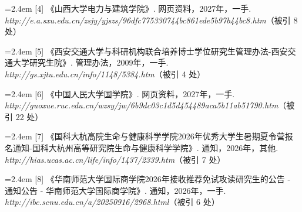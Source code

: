 {\noindent\hangindent=2.4em \label{src:S0004}{\color{cAccent}[4]} 《山西大学电力与建筑学院》. 网页资料，2027年，一手. \textit{http://e.a.sxu.edu.cn/zsjy/yjszs/96dfc775330744bc861ede5b97b44bc8.htm}（被引 8 处）\par
\vspace{0.6pt}
\vspace{3.5pt}\par
\nopagebreak\vspace{1pt}
\noindent\hangindent=2.4em \label{src:S0005}{\color{cAccent}[5]} 《西安交通大学与科研机构联合培养博士学位研究生管理办法-西安交通大学研究生院》. 管理办法，2009年，一手. \textit{http://gs.xjtu.edu.cn/info/1148/5384.htm}（被引 4 处）\par
\vspace{0.6pt}
\vspace{3.5pt}\par
\nopagebreak\vspace{1pt}
\noindent\hangindent=2.4em \label{src:S0006}{\color{cAccent}[6]} 《中国人民大学国学院》. 网页资料，2027年，一手. \textit{http://guoxue.ruc.edu.cn/wzsy/jw/6b9dc03c1d5d454489aca5b11ab51790.htm}（被引 22 处）\par
\vspace{0.6pt}
\vspace{3.5pt}\par
\nopagebreak\vspace{1pt}
\noindent\hangindent=2.4em \label{src:S0007}{\color{cAccent}[7]} 《国科大杭高院生命与健康科学学院2026年优秀大学生暑期夏令营报名通知-国科大杭州高等研究院生命与健康科学学院》. 通知，2026年，其他. \textit{http://hias.ucas.ac.cn/life/info/1437/2339.htm}（被引 7 处）\par
\vspace{0.6pt}
\vspace{3.5pt}\par
\nopagebreak\vspace{1pt}
\noindent\hangindent=2.4em \label{src:S0009}{\color{cAccent}[8]} 《华南师范大学国际商学院2026年接收推荐免试攻读研究生的公告 - 通知公告 - 华南师范大学国际商学院》. 通知，2026年，一手. \textit{http://ibc.scnu.edu.cn/a/20250916/2968.html}（被引 6 处）\par
\vspace{0.6pt}
\vspace{3.5pt}\par
}

